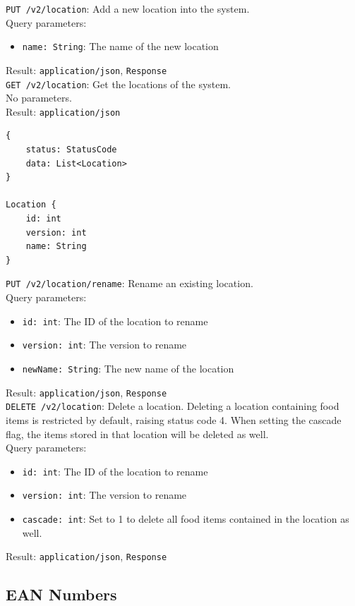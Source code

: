 \documentclass[12pt]{report}
\begin{document}
\texttt{PUT /v2/location}: Add a new location into the system.\\
Query parameters:
\begin{itemize}
\item \texttt{name: String}: The name of the new location
\end{itemize}
Result: \texttt{application/json}, \texttt{Response}\vspace{7mm}\\
\texttt{GET /v2/location}: Get the locations of the system.\\
No parameters.\\
Result: \texttt{application/json}
\begin{lstlisting}
{
    status: StatusCode
    data: List<Location>
}

Location {
    id: int
    version: int
    name: String
}
\end{lstlisting}\vspace{7mm}
\texttt{PUT /v2/location/rename}: Rename an existing location.\\
Query parameters:
\begin{itemize}
\item \texttt{id: int}: The ID of the location to rename
\item \texttt{version: int}: The version to rename
\item \texttt{newName: String}: The new name of the location
\end{itemize}
Result: \texttt{application/json}, \texttt{Response}\vspace{7mm}\\
\texttt{DELETE /v2/location}: Delete a location. Deleting a location containing
food items is restricted by default, raising status code 4. When setting the
cascade flag, the items stored in that location will be deleted as well.\\
Query parameters:
\begin{itemize}
\item \texttt{id: int}: The ID of the location to rename
\item \texttt{version: int}: The version to rename
\item \texttt{cascade: int}: Set to 1 to delete all food items contained
in the location as well.
\end{itemize}
Result: \texttt{application/json}, \texttt{Response}\vspace{7mm}\\

\subsection{EAN Numbers}
\end{document}
